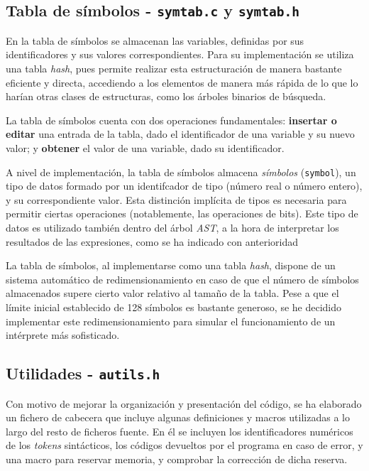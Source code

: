 \documentclass[12pt]{article}
\begin{document}
\subsection{Tabla de símbolos - \texttt{symtab.c} y \texttt{symtab.h}}
En la tabla de símbolos se almacenan las variables, definidas por sus identificadores y sus valores correspondientes. Para su implementación se utiliza una tabla \textit{hash}, pues permite realizar esta estructuración de manera bastante eficiente y directa, accediendo a los elementos de manera más rápida de lo que lo harían otras clases de estructuras, como los árboles binarios de búsqueda.\par
La tabla de símbolos cuenta con dos operaciones fundamentales: \textbf{insertar o editar} una entrada de la tabla, dado el identificador de una variable y su nuevo valor; y \textbf{obtener} el valor de una variable, dado su identificador.\par
A nivel de implementación, la tabla de símbolos almacena \textit{símbolos} (\texttt{symbol}), un tipo de datos formado por un identifcador de tipo (número real o número entero), y su correspondiente valor. Esta distinción implícita de tipos es necesaria para permitir ciertas operaciones (notablemente, las operaciones de bits). Este tipo de datos es utilizado también dentro del árbol \textit{AST}, a la hora de interpretar los resultados de las expresiones, como se ha indicado con anterioridad\par
La tabla de símbolos, al implementarse como una tabla \textit{hash}, dispone de un sistema automático de redimensionamiento en caso de que el número de símbolos almacenados supere cierto valor relativo al tamaño de la tabla. Pese a que el límite inicial establecido de 128 símbolos es bastante generoso, se he decidido implementar este redimensionamiento para simular el funcionamiento de un intérprete más sofisticado.

\subsection{Utilidades - \texttt{autils.h}}
Con motivo de mejorar la organización y presentación del código, se ha elaborado un fichero de cabecera que incluye algunas definiciones y macros utilizadas a lo largo del resto de ficheros fuente. En él se incluyen los identificadores numéricos de los \textit{tokens} sintácticos, los códigos devueltos por el programa en caso de error, y una macro para reservar memoria, y comprobar la corrección de dicha reserva.
\end{document}
